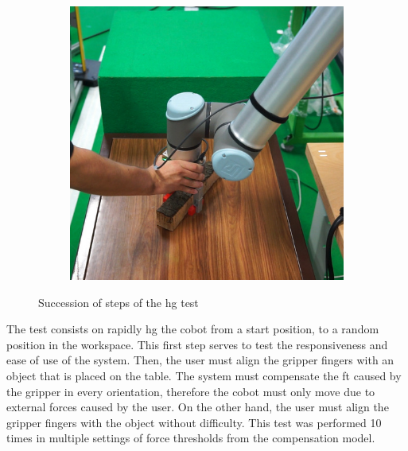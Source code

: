 \begin{figure}[h]
\begin{subfigure}{.2\linewidth}
    \end{subfigure}%
    \begin{subfigure}{.2\linewidth}
        \centering
        \includegraphics[width=.95\linewidth]{figs/chp6/hg_test_4.jpg}
    \end{subfigure}
    \caption{Succession of steps of the \ac{hg} test}
    \label{fig:hg_test}
\end{figure}

\par The test consists on rapidly \ac{hg} the cobot from a start position, to a random position in the workspace. This first step serves to test the responsiveness and ease of use of the system. Then, the user must align the gripper fingers with an object that is placed on the table. The system must compensate the \ac{ft} caused by the gripper in every orientation, therefore the cobot must only move due to external forces caused by the user. On the other hand, the user must align the gripper fingers with the object without difficulty. This test was performed 10 times in multiple settings of force thresholds from the compensation model. 


